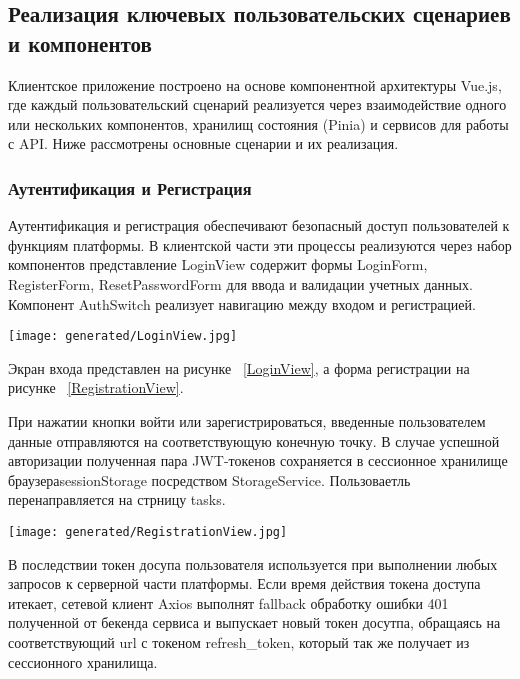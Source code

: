 \subsection{Реализация ключевых пользовательских сценариев и компонентов}

Клиентское приложение построено на основе компонентной архитектуры Vue.js, где каждый пользовательский сценарий реализуется через взаимодействие одного или нескольких компонентов, хранилищ состояния (Pinia) и сервисов для работы с API. Ниже рассмотрены основные сценарии и их реализация.

\subsubsection{Аутентификация и Регистрация}

Аутентификация и регистрация обеспечивают безопасный доступ пользователей к функциям платформы. В клиентской части эти процессы реализуются через набор компонентов представление LoginView содержит формы LoginForm, RegisterForm, ResetPasswordForm для ввода и валидации учетных данных. Компонент AuthSwitch реализует навигацию между входом и регистрацией.

\begin{figure*}[!t]
  \centering
  \texttt{[image: generated/LoginView.jpg]}
  \caption{Форма входа}
  \label{LoginView}
\end{figure*}

Экран входа представлен на рисунке ~\ref{LoginView}, а форма регистрации на рисунке ~\ref{RegistrationView}.

При нажатии кнопки войти или зарегистрироваться, введенные пользователем данные отправляются на соответствующую конечную точку. В случае успешной авторизации полученная пара JWT-токенов сохраняется в сессионное хранилище браузераsessionStorage посредством StorageService. Пользоваетль перенаправляется на стрницу \/tasks.

\begin{figure*}[!t]
  \centering
  \texttt{[image: generated/RegistrationView.jpg]}
  \caption{Форма регистрации}
  \label{RegistrationView}
\end{figure*}

В последствии токен досупа пользователя используется при выполнении любых запросов к серверной части платформы. Если время действия токена доступа итекает, сетевой клиент Axios выполнят fallback обработку ошибки 401 полученной от бекенда сервиса и выпускает новый токен досутпа, обращаясь на соответствующий url с токеном refresh\_token, который так же получает из сессионного хранилища.

